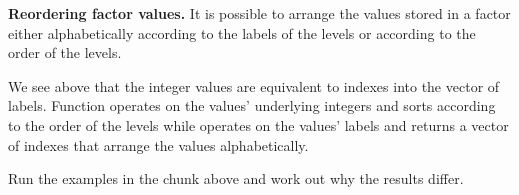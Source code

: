 \documentclass[krantz2]{krantz}\usepackage{knitr}%
\begin{document}
\begin{advplayground}\label{calc:ADVPG:order:sort}
\textbf{Reordering factor values.} It is possible to arrange the values stored in a factor either alphabetically according to the labels of the levels or according to the order of the levels.

\begin{knitrout}\footnotesize
{}\color{fgcolor}\begin{kframe}
\begin{alltt}
 \hlkwb{<-} \hlstd{(}\hlstd{,} \hlstd{,}  \hlstd{=} \hlstd{(}\hlstd{,} \hlstd{,} \hlstd{,} \hlstd{))}
 \hlkwb{<-} \hlstd{(}\hlstd{(}\hlstd{(}\hlstd{,} \hlstd{,} \hlstd{,} \hlstd{),} \hlstd{(}\hlstd{,}\hlstd{)))}
\end{alltt}
\end{kframe}
\end{knitrout}

We see above that the integer values are equivalent to indexes into the vector of labels. Function  operates on the values' underlying integers and sorts according to the order of the levels while  operates on the values' labels and returns a vector of indexes that arrange the values alphabetically.

\begin{knitrout}\footnotesize
{}\color{fgcolor}\begin{kframe}
\begin{alltt}
\hlstd{my.factor4[}\hlstd{(my.factor4)]}
\hlstd{my.factor4[}\hlstd{(}\hlstd{(my.factor4))]}
\end{alltt}
\end{kframe}
\end{knitrout}

Run the examples in the chunk above and work out why the results differ.
\end{advplayground}
\end{document}

